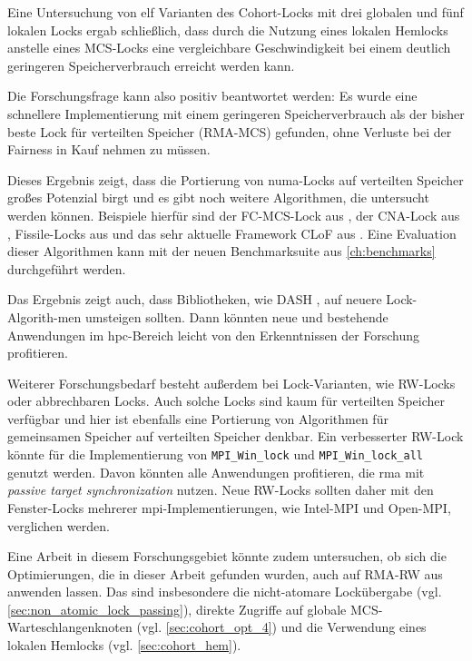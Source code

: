 Eine Untersuchung von elf Varianten des Cohort-Locks mit drei globalen
und fünf lokalen Locks ergab schließlich,
dass durch die Nutzung eines lokalen Hemlocks anstelle eines MCS-Locks
eine vergleichbare Geschwindigkeit
bei einem deutlich geringeren Speicherverbrauch erreicht werden kann.

Die Forschungsfrage kann also positiv beantwortet werden:
Es wurde eine schnellere Implementierung mit einem geringeren Speicherverbrauch
als der bisher beste Lock für verteilten Speicher (RMA-MCS) gefunden,
ohne Verluste bei der Fairness in Kauf nehmen zu müssen.

Dieses Ergebnis zeigt,
dass die Portierung von \gls{numa}-Locks auf verteilten Speicher
großes Potenzial birgt
und es gibt noch weitere Algorithmen,
die untersucht werden können.
Beispiele hierfür sind der FC-MCS-Lock aus \cite{FC-MCS-Lock},
der CNA-Lock aus \cite{CNA-Lock},
Fissile-Locks aus \cite{Fissile-Locks}
und das sehr aktuelle Framework CLoF aus \cite{CLoF}.
Eine Evaluation dieser Algorithmen kann mit der neuen Benchmarksuite aus \autoref{ch:benchmarks}
durchgeführt werden.

Das Ergebnis zeigt auch,
dass Bibliotheken,
wie DASH \cite{DART-MPI},
auf neuere Lock-Algorith-men umsteigen sollten.
Dann könnten neue und bestehende Anwendungen im \gls{hpc}-Bereich leicht
von den Erkenntnissen der Forschung profitieren.

Weiterer Forschungsbedarf besteht außerdem bei Lock-Varianten,
wie RW-Locks oder abbrechbaren Locks.
Auch solche Locks sind kaum für verteilten Speicher verfügbar
und hier ist ebenfalls eine Portierung von Algorithmen für gemeinsamen Speicher
auf verteilten Speicher denkbar.
Ein verbesserter RW-Lock könnte für die Implementierung
von \texttt{MPI\_Win\_lock} und \texttt{MPI\_Win\_lock\_all} genutzt werden.
Davon könnten alle Anwendungen profitieren,
die \gls{rma} mit \textit{passive target synchronization} nutzen.
Neue RW-Locks sollten daher mit den \gls{Fenster}-Locks mehrerer \gls{mpi}-Implementierungen,
wie Intel-MPI und Open-MPI,
verglichen werden.

Eine Arbeit in diesem Forschungsgebiet könnte zudem untersuchen,
ob sich die Optimierungen,
die in dieser Arbeit gefunden wurden,
auch auf RMA-RW aus \cite{RMA-RW} anwenden lassen.
Das sind insbesondere die nicht-atomare Lockübergabe (vgl. \autoref{sec:non_atomic_lock_passing}),
direkte Zugriffe auf globale MCS-Warteschlangenknoten (vgl. \autoref{sec:cohort_opt_4})
und die Verwendung eines lokalen Hemlocks (vgl. \autoref{sec:cohort_hem}).

